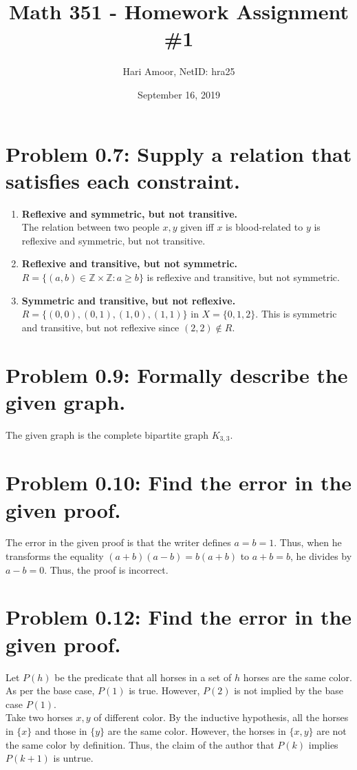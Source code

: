 \documentclass[12pt]{article}
\title{Math 351 - Homework Assignment \#1}
\author{Hari Amoor, NetID: hra25}
\date{September 16, 2019}
\begin{document}
\maketitle

\section*{Problem 0.7: Supply a relation that satisfies each constraint.}
\begin{enumerate}[label=(\alph*)]
	\item \textbf{Reflexive and symmetric, but not transitive.} \\
		\newline
		The relation between two people $x, y$ given iff $x$ is blood-related to $y$ is reflexive and symmetric, but not transitive.
	\item \textbf{Reflexive and transitive, but not symmetric.} \\
		\newline
		$R = \{(a, b) \in \mathbb{Z} \times \mathbb{Z} : a \geq b\}$ is reflexive and transitive, but not symmetric.
	\item \textbf{Symmetric and transitive, but not reflexive.} \\
		\newline
		$R = \{(0, 0), (0, 1), (1, 0), (1, 1)\}$ in $X = \{0, 1, 2\}$. This is symmetric and transitive, but not reflexive since $(2, 2) \notin R$.
\end{enumerate}

\section*{Problem 0.9: Formally describe the given graph.}
The given graph is the complete bipartite graph $K_{3, 3}$.

\section*{Problem 0.10: Find the error in the given proof.}
The error in the given proof is that the writer defines $a = b = 1$. Thus, when he transforms the equality $(a + b)(a - b) = b(a + b)$ to $a + b = b$, he divides by $a - b = 0$. Thus, the proof is incorrect.

\section*{Problem 0.12: Find the error in the given proof.}
Let $P(h)$ be the predicate that all horses in a set of $h$ horses are the same color. As per the base case, $P(1)$ is true. However, $P(2)$ is not implied by the base case $P(1)$. \\
\newline
Take two horses $x, y$ of different color. By the inductive hypothesis, all the horses in $\{x\}$ and those in $\{y\}$ are the same color. However, the horses in $\{x, y\}$ are not the same color by definition. Thus, the claim of the author that $P(k)$ implies $P(k + 1)$ is untrue.
\end{document}

